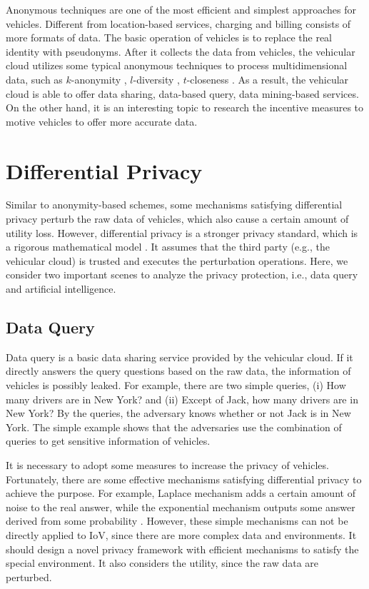 \documentclass[journal,transmag,11pt]{IEEEtran}
\begin{document}
Anonymous techniques are one of the most efficient and simplest approaches for vehicles. Different from location-based services, charging and billing consists of more formats of data. The basic operation of vehicles is to replace the real identity with pseudonyms. After it collects the data from vehicles, the vehicular cloud utilizes some typical anonymous techniques to process multidimensional data, such as $k$-anonymity \cite{conf/icc/WuLYD17}, $l$-diversity \cite{conf/icde/MachanavajjhalaGKV06}, $t$-closeness \cite{conf/icde/LiLV07}. As a result, the vehicular cloud is able to offer data sharing, data-based query, data mining-based services. On the other hand, it is an interesting topic to research the incentive measures to motive vehicles to offer more accurate data.


\section{Differential Privacy}

Similar to anonymity-based schemes, some mechanisms satisfying differential privacy perturb the raw data of vehicles, which also cause a certain amount of utility loss. However, differential privacy is a stronger privacy standard, which is a rigorous mathematical model \cite{conf/tamc/Dwork08}. It assumes that the third party (e.g., the vehicular cloud) is trusted and executes the perturbation operations. Here, we consider two important scenes to analyze the privacy protection, i.e., data query and artificial intelligence.

\subsection{Data Query}

Data query is a basic data sharing service provided by the vehicular cloud. If it directly answers the query questions based on the raw data, the information of vehicles is possibly leaked. For example, there are two simple queries, (i) How many drivers are in New York? and (ii) Except of Jack, how many drivers are in New York? By the queries, the adversary knows whether or not Jack is in New York. The simple example shows that the adversaries use the combination of queries to get sensitive information of vehicles.

It is necessary to adopt some measures to increase the privacy of vehicles. Fortunately, there are some effective mechanisms satisfying differential privacy to achieve the purpose. For example, Laplace mechanism adds a certain amount of noise to the real answer, while the exponential mechanism outputs some answer derived from some probability \cite{conf/tamc/Dwork08}. However, these simple mechanisms can not be directly applied to IoV, since there are more complex data and environments. It should design a novel privacy framework with efficient mechanisms to satisfy the special environment. It also considers the utility, since the raw data are perturbed.  
\end{document}
